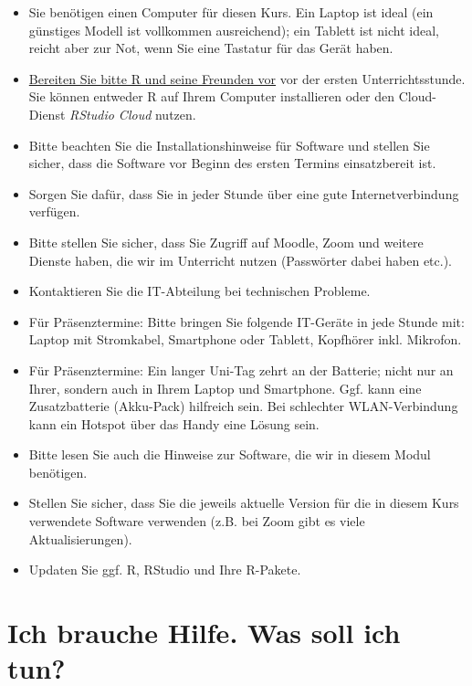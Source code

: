 \documentclass[
  a4paper,
  DIV=11]{scrreprt}
\providecommand{\tightlist}{%
  \setlength{\itemsep}{0pt}\setlength{\parskip}{0pt}}\usepackage{longtable,booktabs,array}
\theoremstyle{definition}
\theoremstyle{definition}
\theoremstyle{remark}
\begin{document}
\begin{itemize}
\tightlist
\item
  Sie benötigen einen Computer für diesen Kurs. Ein Laptop ist ideal
  (ein günstiges Modell ist vollkommen ausreichend); ein Tablett ist
  nicht ideal, reicht aber zur Not, wenn Sie eine Tastatur für das Gerät
  haben.
\item
  \href{https://data-se.netlify.app/2021/11/30/installation-von-r-und-seiner-freunde/}{Bereiten
  Sie bitte R und seine Freunden vor} vor der ersten Unterrichtsstunde.
  Sie können entweder R auf Ihrem Computer installieren oder den
  Cloud-Dienst \emph{RStudio Cloud} nutzen.
\item
  Bitte beachten Sie die Installationshinweise für Software und stellen
  Sie sicher, dass die Software vor Beginn des ersten Termins
  einsatzbereit ist.
\item
  Sorgen Sie dafür, dass Sie in jeder Stunde über eine gute
  Internetverbindung verfügen.
\item
  Bitte stellen Sie sicher, dass Sie Zugriff auf Moodle, Zoom und
  weitere Dienste haben, die wir im Unterricht nutzen (Passwörter dabei
  haben etc.).
\item
  Kontaktieren Sie die IT-Abteilung bei technischen Probleme.
\item
  Für Präsenztermine: Bitte bringen Sie folgende IT-Geräte in jede
  Stunde mit: Laptop mit Stromkabel, Smartphone oder Tablett, Kopfhörer
  inkl. Mikrofon.
\item
  Für Präsenztermine: Ein langer Uni-Tag zehrt an der Batterie; nicht
  nur an Ihrer, sondern auch in Ihrem Laptop und Smartphone. Ggf. kann
  eine Zusatzbatterie (Akku-Pack) hilfreich sein. Bei schlechter
  WLAN-Verbindung kann ein Hotspot über das Handy eine Lösung sein.
\item
  Bitte lesen Sie auch die Hinweise zur Software, die wir in diesem
  Modul benötigen.
\item
  Stellen Sie sicher, dass Sie die jeweils aktuelle Version für die in
  diesem Kurs verwendete Software verwenden (z.B. bei Zoom gibt es viele
  Aktualisierungen).
\item
  Updaten Sie ggf. R, RStudio und Ihre R-Pakete.
\end{itemize}

\hypertarget{ich-brauche-hilfe.-was-soll-ich-tun}{%
\section*{Ich brauche Hilfe. Was soll ich
tun?}\label{ich-brauche-hilfe.-was-soll-ich-tun}}
\end{document}
